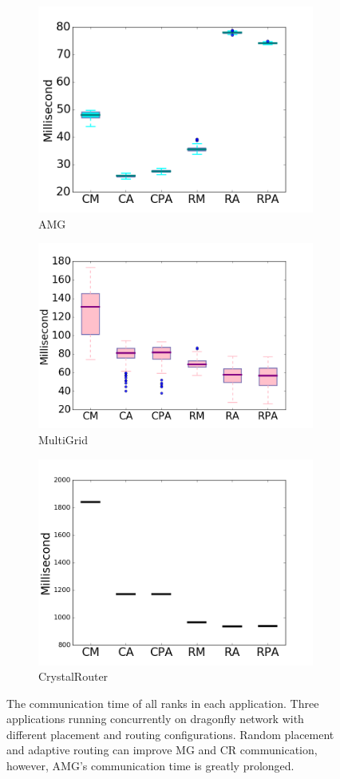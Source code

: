 \documentclass[conference,compsoc]{IEEEtran}
\begin{document}
\begin{figure}[t!]
    \centering
    \begin{subfigure}[t]{0.32\textwidth}
        \centering
        \includegraphics[height=1.5 in]{wkld/amg/commtime}
        \caption{AMG}
        \label{fig:amg-commtime}
    \end{subfigure}%
    \hspace{1em}%
    \begin{subfigure}[t]{0.32\textwidth}
        \centering
        \includegraphics[height=1.5 in]{wkld/mg/commtime}
        \caption{MultiGrid}
        \label{fig:mg-commtime}
    \end{subfigure}%
    \begin{subfigure}[t]{0.32\textwidth}
        \centering
        \includegraphics[height=1.5 in]{wkld/cr/commtime}
        \caption{CrystalRouter}
        \label{fig:cr-commtime}
    \end{subfigure}%
   \caption{The communication time of all ranks in each application. Three applications running concurrently on dragonfly network with different placement and routing configurations. Random placement and adaptive routing can improve MG and CR communication, however, AMG's communication time is greatly prolonged.}
   \label{fig:apps-commtime}
\end{figure}
\end{document}
